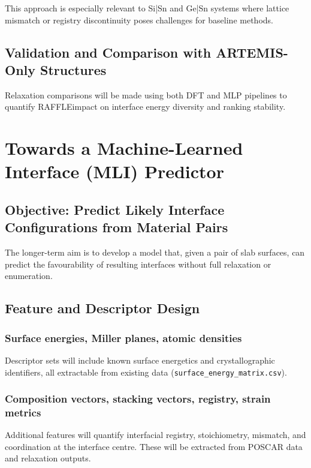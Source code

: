 This approach is especially relevant to Si|Sn and Ge|Sn systems where lattice mismatch or registry discontinuity poses challenges for baseline methods.

\subsection{Validation and Comparison with ARTEMIS-Only Structures}

Relaxation comparisons will be made using both DFT and MLP pipelines to quantify RAFFLE\rqs impact on interface energy diversity and ranking stability.


\section{Towards a Machine-Learned Interface (MLI) Predictor}

\subsection{Objective: Predict Likely Interface Configurations from Material Pairs}

The longer-term aim is to develop a model that, given a pair of slab surfaces, can predict the favourability of resulting interfaces without full relaxation or enumeration.

\subsection{Feature and Descriptor Design}

\subsubsection{Surface energies, Miller planes, atomic densities}

Descriptor sets will include known surface energetics and crystallographic identifiers, all extractable from existing data (\texttt{surface\_energy\_matrix.csv}).

\subsubsection{Composition vectors, stacking vectors, registry, strain metrics}

Additional features will quantify interfacial registry, stoichiometry, mismatch, and coordination at the interface centre. These will be extracted from POSCAR data and relaxation outputs.

